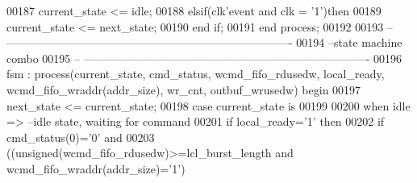 \begin{DoxyCode}
00187         \textcolor{vhdlchar}{current_state} \textcolor{vhdlchar}{<=} \textcolor{vhdlchar}{idle};
00188     \textcolor{keywordflow}{elsif}\textcolor{vhdlchar}{(}\textcolor{vhdlchar}{clk}\textcolor{vhdlchar}{'}\textcolor{vhdlkeyword}{event} \textcolor{keywordflow}{and} \textcolor{vhdlchar}{clk} \textcolor{vhdlchar}{=} \textcolor{vhdlchar}{'}\textcolor{vhdllogic}{}\textcolor{vhdllogic}{1}\textcolor{vhdlchar}{'}\textcolor{vhdlchar}{)}\textcolor{keywordflow}{then} 
00189         \textcolor{vhdlchar}{current_state} \textcolor{vhdlchar}{<=} \textcolor{vhdlchar}{next_state};
00190     \textcolor{keywordflow}{end} \textcolor{keywordflow}{if}; 
00191 \textcolor{keywordflow}{end} \textcolor{keywordflow}{process};
00192 
00193 \textcolor{keyword}{-- ----------------------------------------------------------------------------}
00194 \textcolor{keyword}{--state machine combo}
00195 \textcolor{keyword}{-- ----------------------------------------------------------------------------}
00196 fsm : \textcolor{keywordflow}{process}(current_state, cmd_status, wcmd_fifo_rdusedw, local_ready, 
      wcmd_fifo_wraddr(addr_size), wr_cnt, outbuf_wrusedw) \textcolor{keywordflow}{begin}
00197     \textcolor{vhdlchar}{next_state} \textcolor{vhdlchar}{<=} \textcolor{vhdlchar}{current_state};
00198     \textcolor{keywordflow}{case} \textcolor{vhdlchar}{current_state} \textcolor{keywordflow}{is}
00199       
00200         \textcolor{keywordflow}{when} \textcolor{vhdlchar}{idle} \textcolor{vhdlchar}{=}\textcolor{vhdlchar}{>}\textcolor{keyword}{                            --idle state, waiting for command}
00201             \textcolor{keywordflow}{if} \textcolor{vhdlchar}{local_ready}\textcolor{vhdlchar}{=}\textcolor{vhdlchar}{'}\textcolor{vhdllogic}{}\textcolor{vhdllogic}{1}\textcolor{vhdlchar}{'} \textcolor{keywordflow}{then}  
00202                 \textcolor{keywordflow}{if} \textcolor{vhdlchar}{cmd_status}\textcolor{vhdlchar}{(}\textcolor{vhdllogic}{}\textcolor{vhdllogic}{0}\textcolor{vhdlchar}{)}\textcolor{vhdlchar}{=}\textcolor{vhdlchar}{'}\textcolor{vhdllogic}{}\textcolor{vhdllogic}{0}\textcolor{vhdlchar}{'} \textcolor{keywordflow}{and} 
00203                     \textcolor{vhdlchar}{(}\textcolor{vhdlchar}{(}\textcolor{comment}{unsigned}\textcolor{vhdlchar}{(}\textcolor{vhdlchar}{wcmd_fifo_rdusedw}\textcolor{vhdlchar}{)}\textcolor{vhdlchar}{>=}\textcolor{vhdlchar}{lcl_burst_length} \textcolor{keywordflow}{and} \textcolor{vhdlchar}{
      wcmd_fifo_wraddr}\textcolor{vhdlchar}{(}\textcolor{vhdlchar}{addr_size}\textcolor{vhdlchar}{)}\textcolor{vhdlchar}{=}\textcolor{vhdlchar}{'}\textcolor{vhdllogic}{}\textcolor{vhdllogic}{1}\textcolor{vhdlchar}{'}\textcolor{vhdlchar}{)} 

\end{DoxyCode}
